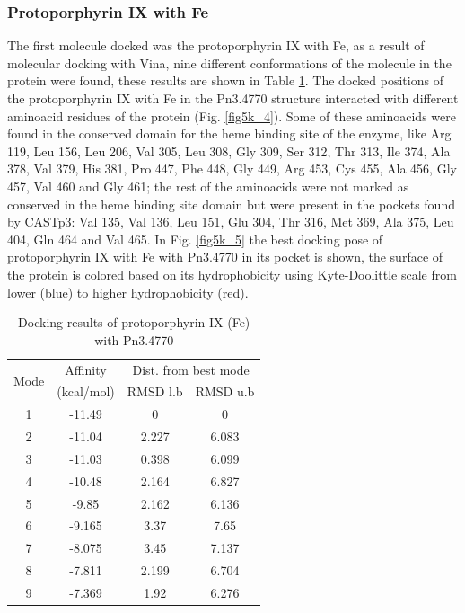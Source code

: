 \documentclass[12pt]{article}
\begin{document}
	\subsubsection{Protoporphyrin IX with Fe}
	
	The first molecule docked was the protoporphyrin IX with Fe, as a result of molecular docking with Vina, nine different conformations of the molecule in the protein were found, these results are shown in Table \ref{table5k_1}. The docked positions of the protoporphyrin IX with Fe in the Pn3.4770 structure interacted with different aminoacid residues of the protein (Fig. \ref{fig5k_4}). Some of these aminoacids were found in the conserved domain for the heme binding site of the enzyme, like Arg 119, Leu 156, Leu 206, Val 305, Leu 308, Gly 309, Ser 312, Thr 313, Ile 374, Ala 378, Val 379, His 381, Pro 447, Phe 448, Gly 449, Arg 453, Cys 455, Ala 456, Gly 457, Val 460 and Gly 461; the rest of the aminoacids were not marked as conserved in the heme binding site domain but were present in the pockets found by CASTp3: Val 135, Val 136, Leu 151, Glu 304, Thr 316, Met 369, Ala 375, Leu 404, Gln 464 and Val 465. In Fig. \ref{fig5k_5} the best docking pose of protoporphyrin IX with Fe with Pn3.4770 in its pocket is shown, the surface of the protein is colored based on its hydrophobicity using Kyte-Doolittle scale from lower (blue) to higher hydrophobicity (red).
	
	
	
	\begin{table}[h!]
		\centering
		\caption{Docking results of protoporphyrin IX (Fe) with Pn3.4770}
		\label{table5k_1}
		\begin{tabular}{cccc}
			\toprule
			\multirow{2}{*}{Mode} & Affinity & \multicolumn{2}{c}{Dist. from best mode}\\
			&  (kcal/mol) & RMSD l.b & RMSD u.b\\
			\midrule
			1 & -11.49   &       0   &       0\\
			2 & -11.04   &   2.227   &   6.083\\
			3 & -11.03   &   0.398   &   6.099\\
			4 & -10.48   &   2.164   &   6.827\\
			5 &  -9.85   &   2.162   &   6.136\\
			6 & -9.165   &    3.37   &    7.65\\
			7 & -8.075   &    3.45   &   7.137\\
			8 & -7.811   &   2.199   &   6.704\\
			9 & -7.369   &    1.92   &   6.276\\
			\bottomrule
			
		\end{tabular}
	\end{table}
	
\end{document}
